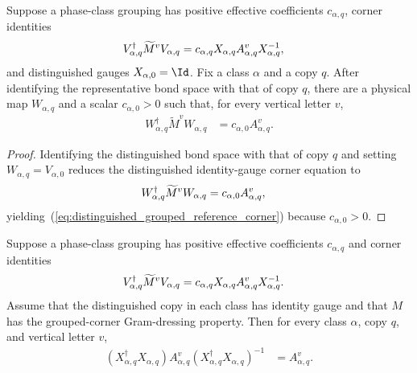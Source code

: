\begin{lemma}
    \label{thm:distinguished_grouped_reference_corner}
    \leanok
    Suppose a phase-class grouping has positive effective coefficients
    $c_{\alpha,q}$, corner identities
    \begin{align}
        V_{\alpha,q}^\dagger\widetilde M^vV_{\alpha,q}
         & =c_{\alpha,q}X_{\alpha,q}A_{\alpha,q}^vX_{\alpha,q}^{-1},
        \notag
    \end{align}
    and distinguished gauges $X_{\alpha,0}=\Id$. Fix a class $\alpha$ and a
    copy $q$. After identifying the representative bond space with that of
    copy $q$, there are a physical map $W_{\alpha,q}$ and a scalar
    $c_{\alpha,0}>0$ such that, for every vertical letter $v$,
    \begin{align}
        W_{\alpha,q}^\dagger\widetilde M^vW_{\alpha,q}
         & =c_{\alpha,0}A_{\alpha,q}^v.
        \label{eq:distinguished_grouped_reference_corner}
    \end{align}
\end{lemma}

\begin{proof}\leanok
    Identifying the distinguished bond space with that of copy $q$ and setting
    $W_{\alpha,q}=V_{\alpha,0}$ reduces the distinguished identity-gauge corner
    equation to
    \begin{align}
        W_{\alpha,q}^\dagger\widetilde M^vW_{\alpha,q}
         & =c_{\alpha,0}A_{\alpha,q}^v,
        \notag
    \end{align}
    yielding~(\ref{eq:distinguished_grouped_reference_corner}) because $c_{\alpha,0}>0$.
\end{proof}

\begin{lemma}
    \label{thm:grouped_sector_gram_conj_of_dressing}
    \leanok
    Suppose a phase-class grouping has positive effective coefficients
    $c_{\alpha,q}$ and corner identities
    \begin{align}
        V_{\alpha,q}^\dagger\widetilde M^vV_{\alpha,q}
         & =c_{\alpha,q}X_{\alpha,q}A_{\alpha,q}^v
        X_{\alpha,q}^{-1}.
        \notag
    \end{align}
    Assume that the distinguished copy in each class has identity gauge and
    that $M$ has the grouped-corner Gram-dressing property. Then for every
    class $\alpha$, copy $q$, and vertical letter $v$,
    \begin{align}
        (X_{\alpha,q}^\dagger X_{\alpha,q})A_{\alpha,q}^v
        (X_{\alpha,q}^\dagger X_{\alpha,q})^{-1}
         & =A_{\alpha,q}^v.
        \label{eq:grouped_sector_gram_conj_of_dressing}
    \end{align}
\end{lemma}

